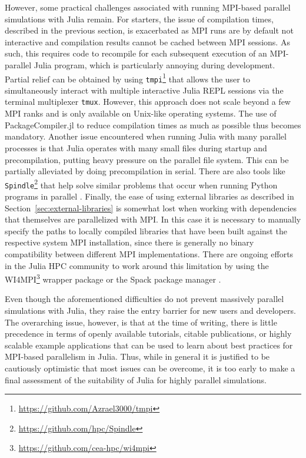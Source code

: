 \documentclass[hidelinks]{juliacon} %
\begin{document}
However, some practical challenges associated with running MPI-based parallel
simulations with Julia remain. For starters, the issue of compilation times, described in the previous
section, is exacerbated as MPI runs are by default not interactive and compilation results cannot be cached between MPI sessions. As such, this
requires code to recompile for each subsequent execution of an MPI-parallel Julia program,
which is particularly annoying during development. Partial relief can be obtained by using
\texttt{tmpi}\footnote{\url{https://github.com/Azrael3000/tmpi}} that allows the user to simultaneously
interact with multiple interactive Julia REPL sessions via the terminal multiplexer \texttt{tmux}.
However, this approach does not scale beyond a few MPI ranks and is only available on
Unix-like operating systems. The use of PackageCompiler.jl to reduce compilation times as much as
possible thus becomes mandatory. Another issue encountered when running Julia with many parallel
processes is that Julia operates with many small files during startup and precompilation,
putting heavy pressure on the parallel file system. This can be partially alleviated by doing
precompilation in serial. There are also tools like
\texttt{Spindle}\footnote{\url{https://github.com/hpc/Spindle}} that help solve similar
problems that occur when running Python programs in parallel \cite{frings2013parallelloading}.
Finally, the ease of using external libraries as described in Section~\ref{sec:external-libraries} is
somewhat lost when working with dependencies that themselves are parallelized with MPI. In this
case it is necessary to manually specify the paths to locally compiled libraries that have been
built against the respective system MPI installation, since there is generally no binary
compatibility between different MPI implementations. There are ongoing efforts in the Julia HPC
community to work around this limitation by using the
WI4MPI\footnote{\url{https://github.com/cea-hpc/wi4mpi}} wrapper package or the
Spack package manager \cite{gamblin2015spack,byrne2021mpi}.

Even though the aforementioned difficulties do not prevent massively parallel simulations with
Julia, they raise the entry barrier for new users and developers. The overarching issue, however, is
that at the time of writing, there is little precedence in terms of openly available tutorials,
citable publications, or highly scalable example applications that can be used to learn about best
practices for MPI-based parallelism in Julia. Thus, while in general it is justified to be cautiously
optimistic that most issues can be overcome, it is too early to make a final assessment of the
suitability of Julia for highly parallel simulations.
\end{document}
